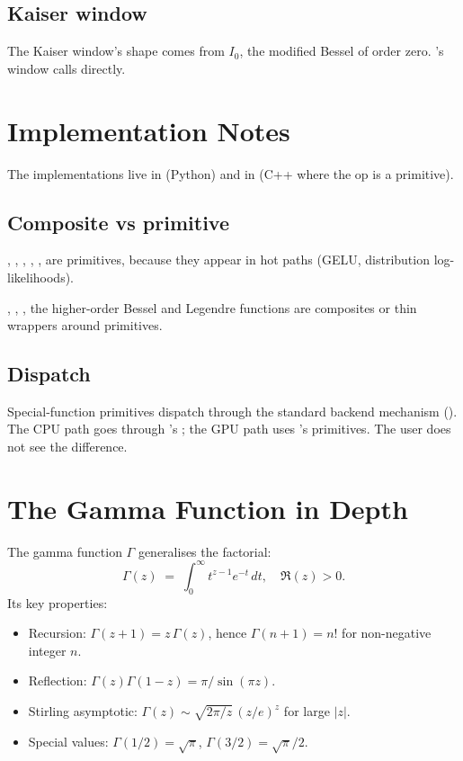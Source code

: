 \subsection{Kaiser window}
\label{ssec:special_functions:kaiser_uc}

The Kaiser window's shape comes from $I_0$, the modified Bessel
of order zero. \Lucid's  window calls 
directly.

\section{Implementation Notes}
\label{sec:special_functions:impl}

The implementations live in  (Python) and
in  (C++ where the op is a primitive).

\subsection{Composite vs primitive}
\label{ssec:special_functions:composite_vs_prim}

, , , , ,
 are primitives, because they appear in hot paths
(GELU, distribution log-likelihoods).

, , , the higher-order
Bessel and Legendre functions are composites or thin wrappers
around primitives.

\subsection{Dispatch}
\label{ssec:special_functions:dispatch}

Special-function primitives dispatch through the standard
backend mechanism (). The CPU path
goes through \Accelerate's ; the GPU path uses
\MLX's primitives. The user does not see the difference.

\section{The Gamma Function in Depth}
\label{sec:special_functions:gamma_depth}

The gamma function $\Gamma$ generalises the factorial:
\[
\Gamma(z) \;=\; \int_0^\infty t^{z-1} e^{-t}\, dt,
\quad \Re(z) > 0.
\]
Its key properties:

\begin{itemize}
  \item Recursion: $\Gamma(z + 1) = z\,\Gamma(z)$, hence
    $\Gamma(n+1) = n!$ for non-negative integer $n$.
  \item Reflection: $\Gamma(z)\Gamma(1-z) = \pi /
    \sin(\pi z)$.
  \item Stirling asymptotic: $\Gamma(z) \sim \sqrt{2\pi/z}\,
    (z/e)^z$ for large $|z|$.
  \item Special values: $\Gamma(1/2) = \sqrt{\pi}$,
    $\Gamma(3/2) = \sqrt{\pi}/2$.
\end{itemize}


